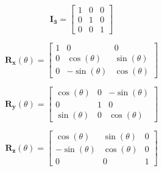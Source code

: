 \documentclass[11pt]{article}
\begin{document}
$$\mathbf{I_3} = \begin{bmatrix}
				1 & 0 & 0 \\
				0 & 1 & 0 \\
				0 & 0 & 1
		 \end{bmatrix}$$

$$\mathbf{R_x}(\theta) = \begin{bmatrix}
				        1 &        0      &       0      \\
				        0 &  \cos(\theta) & \sin(\theta) \\
				        0 & -\sin(\theta) & \cos(\theta)
			\end{bmatrix}$$

$$\mathbf{R_y}(\theta) = \begin{bmatrix}
				        \cos(\theta) & 0 & -\sin(\theta) \\
				              0      & 1 &        0	 \\
				        \sin(\theta) & 0 &  \cos(\theta)
			\end{bmatrix}$$

$$\mathbf{R_z}(\theta) = \begin{bmatrix}
				         \cos(\theta) & \sin(\theta) & 0 \\
				        -\sin(\theta) & \cos(\theta) & 0 \\
				              0       &       0      & 1
			\end{bmatrix}$$
\end{document}
